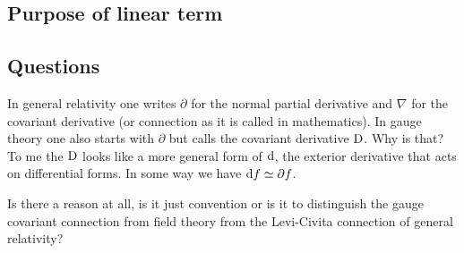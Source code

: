 \documentclass[11pt, english, fleqn, DIV=15, headinclude]{scrartcl}
\begin{document}
\subsection{Purpose of linear term}

\begin{appendix}
    \section{Questions} 

\begin{question}
    In general relativity one writes $\partial$ for the normal partial
    derivative and $\nabla$ for the covariant derivative (or connection as it
    is called in mathematics). In gauge theory one also starts with $\partial$
    but calls the covariant derivative $\mathop{}\!\mathrm D$. Why is that? To me the $\mathop{}\!\mathrm D$
    looks like a more general form of $\mathop{}\!\mathrm d$, the exterior derivative that acts
    on differential forms. In some way we have $\dif f \simeq \vec\partial f$.

    Is there a reason at all, is it just convention or is it to distinguish the
    gauge covariant connection from field theory from the Levi-Civita
    connection of general relativity?
\end{question}

\end{appendix}
\end{document}
